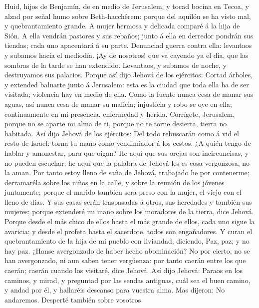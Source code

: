  Huid, hijos de Benjamín, de en medio de Jerusalem, y tocad
bocina en Tecoa, y alzad por señal humo sobre Beth-hacchêrem: porque del
aquilón se ha visto mal, y quebrantamiento grande.  A mujer
hermosa y delicada comparé á la hija de Sión.  A ella
vendrán pastores y sus rebaños; junto á ella en derredor pondrán sus
tiendas; cada uno apacentará á su parte.  Denunciad guerra
contra ella: levantaos y subamos hacia el mediodía. ¡Ay de nosotros! que
va cayendo ya el día, que las sombras de la tarde se han extendido.
 Levantaos, y subamos de noche, y destruyamos sus palacios.
 Porque así dijo Jehová de los ejércitos: Cortad árboles, y
extended baluarte junto á Jerusalem: esta es la ciudad que toda ella ha
de ser visitada; violencia hay en medio de ella.  Como la
fuente nunca cesa de manar sus aguas, así nunca cesa de manar su
malicia; injusticia y robo se oye en ella; continuamente en mi
presencia, enfermedad y herida.  Corrígete, Jerusalem,
porque no se aparte mi alma de ti, porque no te torne desierta, tierra
no habitada.  Así dijo Jehová de los ejércitos: Del todo
rebuscarán como á vid el resto de Israel: torna tu mano como vendimiador
á los cestos.  ¿A quién tengo de hablar y amonestar, para
que oigan? He aquí que sus orejas son incircuncisas, y no pueden
escuchar; he aquí que la palabra de Jehová les es cosa vergonzosa, no la
aman.  Por tanto estoy lleno de saña de Jehová, trabajado
he por contenerme; derramaréla sobre los niños en la calle, y sobre la
reunión de los jóvenes juntamente; porque el marido también será preso
con la mujer, el viejo con el lleno de días.  Y sus casas
serán traspasadas á otros, sus heredades y también sus mujeres; porque
extenderé mi mano sobre los moradores de la tierra, dice Jehová.
 Porque desde el más chico de ellos hasta el más grande de
ellos, cada uno sigue la avaricia; y desde el profeta hasta el
sacerdote, todos son engañadores.  Y curan el
quebrantamiento de la hija de mi pueblo con liviandad, diciendo, Paz,
paz; y no hay paz.  ¿Hanse avergonzado de haber hecho
abominación? No por cierto, no se han avergonzado, ni aun saben tener
vergüenza: por tanto caerán entre los que caerán; caerán cuando los
visitaré, dice Jehová.  Así dijo Jehová: Paraos en los
caminos, y mirad, y preguntad por las sendas antiguas, cuál sea el buen
camino, y andad por él, y hallaréis descanso para vuestra alma. Mas
dijeron: No andaremos.  Desperté también sobre vosotros
